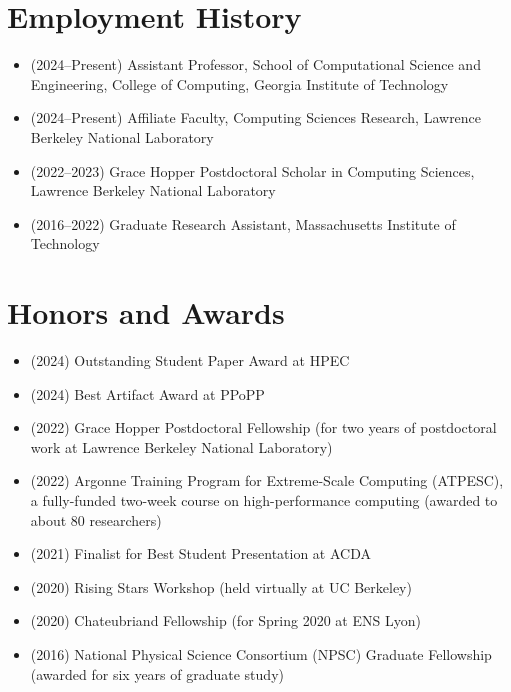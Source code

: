 \section{Employment History}
\begin{adjustwidth}{2em}{0pt}

\begin{itemize}
    \item (2024--Present) Assistant Professor, School of Computational Science
    and Engineering, College of Computing, Georgia Institute of Technology
        \item (2024--Present) Affiliate Faculty, Computing Sciences Research,
        Lawrence Berkeley National Laboratory
    \item (2022--2023) Grace Hopper Postdoctoral Scholar in Computing Sciences,
    Lawrence Berkeley National Laboratory
    \item (2016--2022) Graduate Research Assistant, Massachusetts Institute of Technology
\end{itemize}

\end{adjustwidth}

\section{Honors and Awards}
\begin{adjustwidth}{2em}{0pt}

\begin{itemize}
    \item (2024) Outstanding Student Paper Award at HPEC
    \item (2024) Best Artifact Award at PPoPP
    \item (2022) Grace Hopper Postdoctoral Fellowship (for two years of
    postdoctoral work at Lawrence Berkeley National Laboratory)
    \item (2022) Argonne Training Program for Extreme-Scale Computing (ATPESC), a fully-funded two-week course on high-performance computing (awarded to about 80 researchers)
    \item (2021) Finalist for Best Student Presentation at ACDA
    \item (2020) Rising Stars Workshop (held virtually at UC Berkeley)
    \item (2020) Chateubriand Fellowship (for Spring 2020 at ENS Lyon)
    \item (2016) National Physical Science Consortium (NPSC) Graduate Fellowship
  (awarded for six years of graduate study)
\end{itemize}

\end{adjustwidth}

